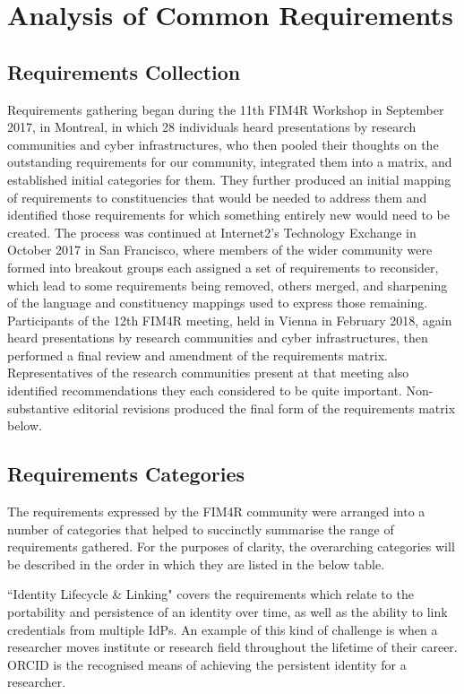 \documentclass[fleqn,10pt]{wlscirep}
\begin{document}
{\section{Analysis of Common Requirements}

\subsection{Requirements Collection}
Requirements gathering began during the 11th FIM4R Workshop in September 2017, in Montreal, in which 28 individuals heard presentations by research communities and cyber infrastructures, who then pooled their thoughts on the outstanding requirements for our community, integrated them into a matrix, and established initial categories for them. They further produced an initial mapping of requirements to constituencies that would be needed to address them and identified those requirements for which something entirely new would need to be created. The process was continued at Internet2’s Technology Exchange in October 2017 in San Francisco, where members of the wider community were formed into breakout groups each assigned a set of requirements to reconsider, which lead to some requirements being removed, others merged, and sharpening of the language and constituency mappings used to express those remaining. Participants of the 12th FIM4R meeting, held in Vienna in February 2018, again heard presentations by research communities and cyber infrastructures, then performed a final review and amendment of the requirements matrix. Representatives of the research communities present at that meeting also identified recommendations they each considered to be quite important. Non-substantive editorial revisions produced the final form of the requirements matrix below.

\subsection{Requirements Categories}
The requirements expressed by the FIM4R community were arranged into a number of categories that helped to succinctly summarise the range of requirements gathered.  For the purposes of clarity, the overarching categories will be described in the order in which they are listed in the below table.

``Identity Lifecycle \& Linking" covers the requirements which relate to the portability and persistence of an identity over time, as well as the ability to link credentials from multiple IdPs.  An example of this kind of challenge is when a researcher moves institute or research field throughout the lifetime of their career.  ORCID is the recognised means of achieving the persistent identity for a researcher.

}
\end{document}
